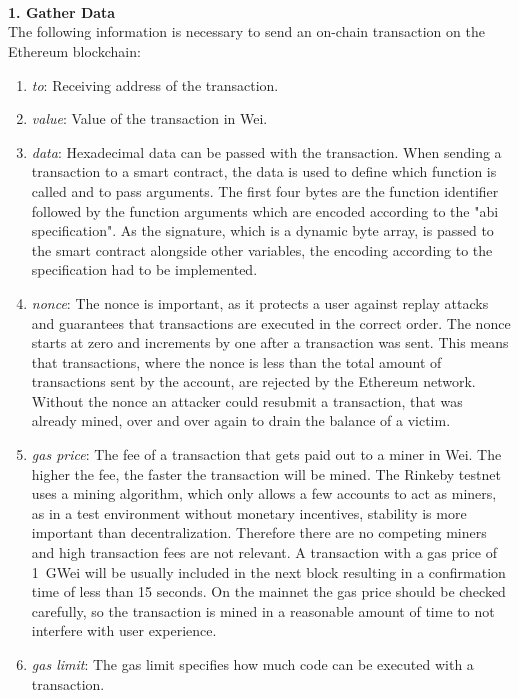 \\\\\\
\textbf{1. Gather Data}\\
The following information is necessary to send an on-chain transaction on the Ethereum blockchain:
\begin{enumerate}
  \item \textit{to}: Receiving address of the transaction.
  \item \textit{value}: Value of the transaction in Wei.
  \item \textit{data}: Hexadecimal data can be passed with the transaction.
  When sending a transaction to a smart contract, the data is used to define which function is called and to pass arguments.
  The first four bytes are the function identifier followed by the function arguments which are encoded according to the "abi specification"\cite{abi-encoding}.
  As the signature, which is a dynamic byte array, is passed to the smart contract alongside other variables, the encoding according to the specification had to be implemented.
  \item \textit{nonce}: The nonce is important, as it protects a user against replay attacks and guarantees that transactions are executed in the correct order.
  The nonce starts at zero and increments by one after a transaction was sent.
  This means that transactions, where the nonce is less than the total amount of transactions sent by the account, are rejected by the Ethereum network.
  Without the nonce an attacker could resubmit a transaction, that was already mined, over and over again to drain the balance of a victim.
  \item \textit{gas price}: The fee of a transaction that gets paid out to a miner in Wei.
  The higher the fee, the faster the transaction will be mined.
  The Rinkeby testnet uses a  mining algorithm, which only allows a few accounts to act as miners, as in a test environment without monetary incentives, stability is more important than decentralization.
  Therefore there are no competing miners and high transaction fees are not relevant.
  A transaction with a gas price of 1~GWei will be usually included in the next block resulting in a confirmation time of less than 15 seconds.
  On the mainnet the gas price should be checked carefully, so the transaction is mined in a reasonable amount of time to not interfere with user experience.
  \item \textit{gas limit}: The gas limit specifies how much code can be executed with a transaction.

\end{enumerate}
